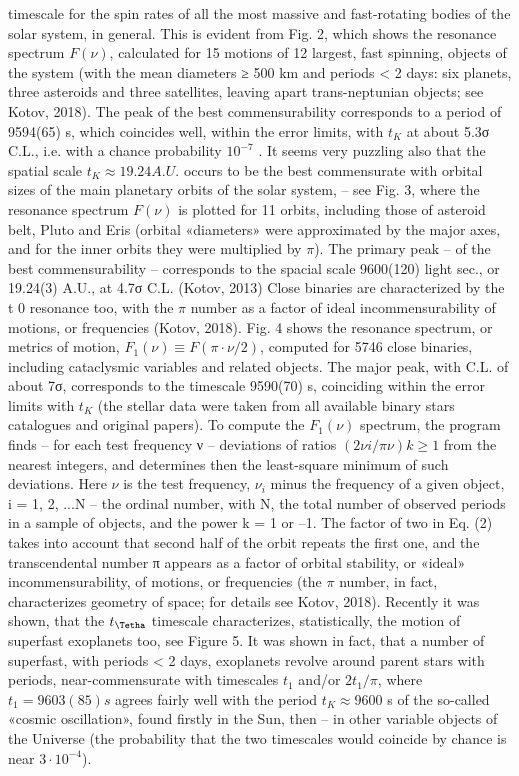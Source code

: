 timescale for the spin rates of all the most massive and fast-rotating bodies of the solar system, in
general.
This is evident from Fig. 2, which shows the resonance spectrum $F(\nu)$, calculated for 15
motions of 12 largest, fast spinning, objects of the system (with the mean diameters ≥ 500 km and
periods < 2 days: six planets, three asteroids and three satellites, leaving apart trans-neptunian
objects; see Kotov, 2018). The peak of the best commensurability corresponds to a period of
9594(65) s, which coincides well, within the error limits, with $t_K$ at about 5.3σ C.L., i.e. with a
chance probability $10^{-7}$ .
It seems very puzzling also that the spatial scale $t_{K} \approx 19.24 A.U.$ occurs to be the best
commensurate with orbital sizes of the main planetary orbits of the solar system, – see Fig. 3,
where the resonance spectrum $F(\nu)$ is plotted for 11 orbits, including those of asteroid belt, Pluto
and Eris (orbital «diameters» were approximated by the major axes, and for the inner orbits they
were multiplied by $\pi$). The primary peak – of the best commensurability – corresponds to the
spacial scale 9600(120) light sec., or 19.24(3) A.U., at 4.7σ C.L. (Kotov, 2013)
Close binaries are characterized by the t 0 resonance too, with the $\pi$ number as a factor of ideal
incommensurability of motions, or frequencies (Kotov, 2018). Fig. 4 shows the resonance spectrum,
or metrics of motion, $F_{1} (\nu) \equiv F(\pi \cdot \nu/2)$, computed for 5746 close binaries, including cataclysmic
variables and related objects. The major peak, with C.L. of about 7σ, corresponds to the timescale
9590(70) s, coinciding within the error limits with $t_{K}$ (the stellar data were taken from all available
binary stars catalogues and original papers).
To compute the $F_{1} (\nu)$ spectrum, the program finds – for each test frequency ν – deviations of
ratios $(2\nu i /\pi \nu) k ≥ 1$ from the nearest integers, and determines then the least-square minimum of such
deviations. Here $\nu$ is the test frequency, $ν_{i}$ minus the frequency of a given object, i = 1, 2, ...N – the
ordinal number, with N, the total number of observed periods in a sample of objects, and the power
k = 1 or –1. The factor of two in Eq. (2) takes into account that second half of the orbit repeats the
first one, and the transcendental number π appears as a factor of orbital stability, or «ideal»
incommensurability, of motions, or frequencies (the $\pi$ number, in fact, characterizes geometry of
space; for details see Kotov, 2018).
Recently it was shown, that the $t_{\Tetha}$ timescale characterizes, statistically, the motion of superfast
exoplanets too, see Figure 5.
It was shown in fact, that a number of superfast, with periods < 2 days, exoplanets revolve
around parent stars with periods, near-commensurate with timescales $t_{1}$ and/or $2 t_{1}/\pi$, where $t_{1} =
9603(85) s$ agrees fairly well with the period $t_{K} \approx 9600$ s of the so-called «cosmic oscillation», found
firstly in the Sun, then – in other variable objects of the Universe (the probability that the two
timescales would coincide by chance is near $3 \cdot 10^{-4}$).

